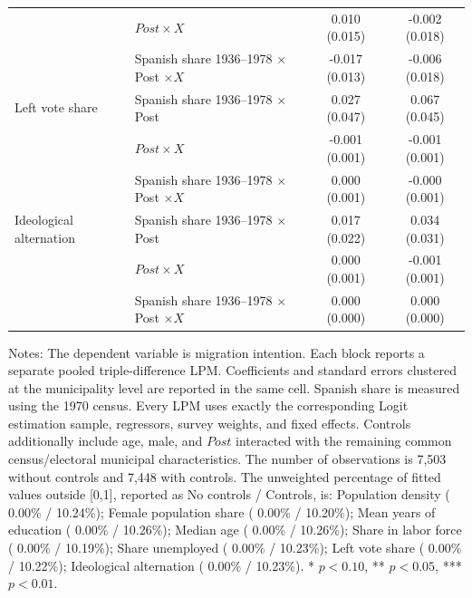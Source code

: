 \begin{table}[!htbp]
\begin{tabular}{llcc}
 & \(Post \times X\) & 0.010 (0.015) & -0.002 (0.018) \\
 & Spanish share 1936--1978 \(\times\) Post \(\times X\) & -0.017 (0.013) & -0.006 (0.018) \\
\addlinespace
Left vote share & Spanish share 1936--1978 \(\times\) Post & 0.027 (0.047) & 0.067 (0.045) \\
 & \(Post \times X\) & -0.001 (0.001) & -0.001 (0.001) \\
 & Spanish share 1936--1978 \(\times\) Post \(\times X\) & 0.000 (0.001) & -0.000 (0.001) \\
\addlinespace
Ideological alternation & Spanish share 1936--1978 \(\times\) Post & 0.017 (0.022) & 0.034 (0.031) \\
 & \(Post \times X\) & 0.000 (0.001) & -0.001 (0.001) \\
 & Spanish share 1936--1978 \(\times\) Post \(\times X\) & 0.000 (0.000) & 0.000 (0.000) \\
\hline
\end{tabular}
\par\vspace{1.5mm}
\begin{minipage}{0.98\linewidth}
\footnotesize\setlength{\parindent}{0pt}\setlength{\parskip}{1pt}
Notes: The dependent variable is migration intention. Each block reports a separate pooled triple-difference LPM. Coefficients and standard errors clustered at the municipality level are reported in the same cell. Spanish share is measured using the 1970 census. Every LPM uses exactly the corresponding Logit estimation sample, regressors, survey weights, and fixed effects. Controls additionally include age, male, and \(Post\) interacted with the remaining common census/electoral municipal characteristics. The number of observations is        7,503 without controls and        7,448 with controls. The unweighted percentage of fitted values outside [0,1], reported as No controls / Controls, is: Population density ( 0.00\% / 10.24\%); Female population share ( 0.00\% / 10.20\%); Mean years of education ( 0.00\% / 10.26\%); Median age ( 0.00\% / 10.26\%); Share in labor force ( 0.00\% / 10.19\%); Share unemployed ( 0.00\% / 10.23\%); Left vote share ( 0.00\% / 10.22\%); Ideological alternation ( 0.00\% / 10.23\%). * \(p<0.10\), ** \(p<0.05\), *** \(p<0.01\).
\end{minipage}
\end{table}
